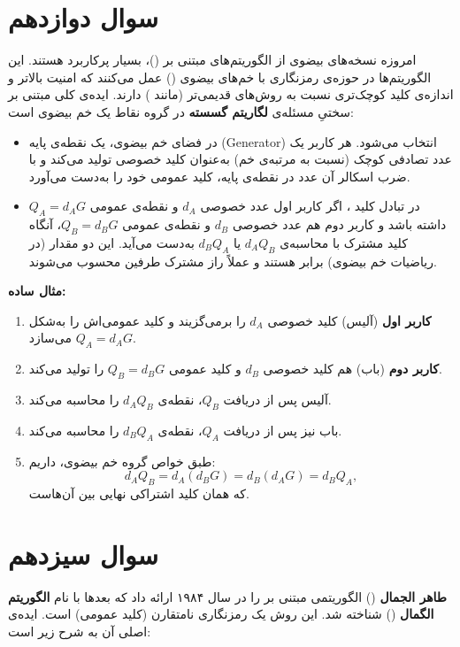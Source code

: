 \documentclass{report}
\begin{document}
\section{سوال دوازدهم}

امروزه نسخه‌های بیضوی از الگوریتم‌های مبتنی بر  ()، بسیار پرکاربرد هستند. این الگوریتم‌ها در حوزه‌ی رمزنگاری با خم‌های بیضوی () عمل می‌کنند که امنیت بالاتر و اندازه‌ی کلید کوچک‌تری نسبت به روش‌های قدیمی‌تر (مانند ) دارند. ایده‌ی کلی مبتنی بر سختیِ مسئله‌ی \textbf{لگاریتم گسسته} در گروه نقاط یک خم بیضوی است:

\begin{itemize}
    \item
     در فضای خم بیضوی، یک نقطه‌ی پایه (Generator) انتخاب می‌شود. هر کاربر یک عدد تصادفی کوچک (نسبت به مرتبه‌ی خم) به‌عنوان کلید خصوصی تولید می‌کند و با ضرب اسکالر آن عدد در نقطه‌ی پایه، کلید عمومی خود را به‌دست می‌آورد.
    \item
     در تبادل کلید ، اگر کاربر اول عدد خصوصی $d_A$ و نقطه‌ی عمومی $Q_A = d_A G$ داشته باشد و کاربر دوم هم عدد خصوصی $d_B$ و نقطه‌ی عمومی $Q_B = d_B G$، آنگاه کلید مشترک با محاسبه‌ی $d_A Q_B$ یا $d_B Q_A$ به‌دست می‌آید. این دو مقدار (در ریاضیات خم بیضوی) برابر هستند و عملاً راز مشترک طرفین محسوب می‌شوند.
\end{itemize}

\noindent\textbf{مثال ساده:}
\begin{enumerate}
    \item \textbf{کاربر اول} (آلیس) کلید خصوصی $d_A$ را برمی‌گزیند و کلید عمومی‌اش را به‌شکل $Q_A = d_A G$ می‌سازد.
    \item \textbf{کاربر دوم} (باب) هم کلید خصوصی $d_B$ و کلید عمومی $Q_B = d_B G$ را تولید می‌کند.
    \item آلیس پس از دریافت $Q_B$، نقطه‌ی $d_A Q_B$ را محاسبه می‌کند.
    \item باب نیز پس از دریافت $Q_A$، نقطه‌ی $d_B Q_A$ را محاسبه می‌کند.
    \item طبق خواص گروه خم بیضوی، داریم:
    \[
    d_A Q_B = d_A (d_B G) = d_B (d_A G) = d_B Q_A,
    \]
    که همان کلید اشتراکی نهایی بین آن‌هاست.
\end{enumerate}

\section{سوال سیزدهم}

\textbf{طاهر الجمال} () الگوریتمی مبتنی بر  را در سال ۱۹۸۴ ارائه داد که بعدها با نام \textbf{الگوریتم الگمال} () شناخته شد. این روش یک رمزنگاری نامتقارن (کلید عمومی) است. ایده‌ی اصلی آن به شرح زیر است:
\end{document}
